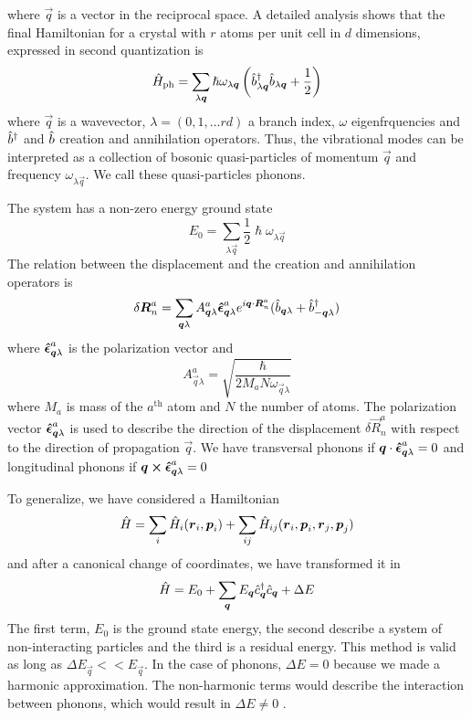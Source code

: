 where $\vec{q}$ is a vector in the reciprocal space. A detailed analysis shows that the final Hamiltonian for a crystal with $r$ atoms per unit cell in $d$ dimensions, expressed in second quantization is
\begin{equation} \label{eq:phonon_hamiltonian}
    \hat{H}_\text{ph} = \sum_{\lambda \mathbf{\boldsymbol{q}}} \hslash \omega_{\lambda\mathbf{\boldsymbol{q}}} \left( \hat{b}^\dagger_{\lambda \mathbf{\boldsymbol{q}}} \hat{b}_{\lambda \mathbf{\boldsymbol{q}}} + \frac{1}{2} \right)
\end{equation}
where $\vec{q}$ is a wavevector, $\lambda = (0,1,\dots rd)$ a branch index, $\omega$ eigenfrquencies and $\hat{b}^\dagger$ and $\hat{b}$ creation and annihilation operators. Thus, the vibrational modes can be interpreted as a collection of bosonic quasi-particles of momentum $\vec{q}$ and frequency $\omega_{\lambda \vec{q}}$. We call these quasi-particles phonons.

The system has a non-zero energy ground state
\begin{equation}
    E_0 = \sum_{\lambda \vec{q}} \frac{1}{2} \hslash\omega_{\lambda\vec{q}}
\end{equation}
The relation between the displacement and the creation and annihilation operators is
\begin{equation} \label{eq:phonon_coordinates}
    \delta \mathbf{\boldsymbol{R}}_n^a = \sum_{\mathbf{\boldsymbol{q}}\lambda} A_{\mathbf{\boldsymbol{q}}\lambda}^a \mathbf{\boldsymbol{\hat{\epsilon}}}_{\mathbf{\boldsymbol{q}}\lambda}^a e^{i\mathbf{\boldsymbol{q}} \cdot \mathbf{\boldsymbol{R}}_n^a} (\hat{b}_{\mathbf{\boldsymbol{q}}\lambda} + \hat{b}^\dagger_{-\mathbf{\boldsymbol{q}}\lambda})
\end{equation}
where $\mathbf{\boldsymbol{\hat{\epsilon}}}_{\mathbf{\boldsymbol{q}}\lambda}^a$ is the polarization vector and
\begin{equation} \label{eq:A_phonon_constant}
    A_{\vec{q}\lambda}^a = \sqrt{\frac{\hslash}{2M_aN\omega_{\vec{q}\lambda}}}
\end{equation}
where $M_a$ is mass of the $a^\text{th}$ atom and $N$ the number of atoms. The polarization vector $\mathbf{\boldsymbol{\hat{\epsilon}}}_{\mathbf{\boldsymbol{q}}\lambda}^a$ is used to describe the direction of the displacement $\delta \vec{R}_n^a$ with respect to the direction of propagation $\vec{q}$. We have transversal phonons if $\mathbf{\boldsymbol{q}} \cdot \mathbf{\boldsymbol{\hat{\epsilon}}}_{\mathbf{\boldsymbol{q}}\lambda}^a = 0$ and longitudinal phonons if $\mathbf{\boldsymbol{q}} \cross \mathbf{\boldsymbol{\hat{\epsilon}}}_{\mathbf{\boldsymbol{q}}\lambda}^a = 0$

To generalize, we have considered a Hamiltonian
\begin{equation}
    \hat{H} = \sum_i \hat{H}_i(\mathbf{\boldsymbol{r}}_i, \mathbf{\boldsymbol{p}}_i) + \sum_{ij} \hat{H}_{ij}(\mathbf{\boldsymbol{r}}_i, \mathbf{\boldsymbol{p}}_i, \mathbf{\boldsymbol{r}}_j, \mathbf{\boldsymbol{p}}_j)
\end{equation}
and after a canonical change of coordinates, we have transformed it in
\begin{equation}
    \hat{H} = E_0 + \sum_{\mathbf{\boldsymbol{q}}} E_{\mathbf{\boldsymbol{q}}} \hat{c}^\dagger_{\mathbf{\boldsymbol{q}}}\hat{c}_{\mathbf{\boldsymbol{q}}} + \Delta E
\end{equation}
The first term, $E_0$ is the ground state energy, the second describe a system of non-interacting particles and the third is a residual energy. This method is valid as long as $\Delta E_\vec{q} << E_\vec{q}$. In the case of phonons, $\Delta E = 0$ because we made a harmonic approximation. The non-harmonic terms would describe the interaction between phonons, which would result in $\Delta E \neq 0$  \cite{cohenFundamentalsCondensedMatter}.


